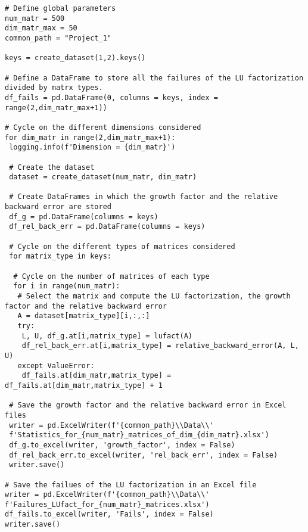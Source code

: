\documentclass[a4paper,11pt]{article}
\begin{document}
\begin{verbatim}
# Define global parameters
num_matr = 500
dim_matr_max = 50
common_path = "Project_1"

keys = create_dataset(1,2).keys()

# Define a DataFrame to store all the failures of the LU factorization divided by matrx types.
df_fails = pd.DataFrame(0, columns = keys, index = range(2,dim_matr_max+1))

# Cycle on the different dimensions considered
for dim_matr in range(2,dim_matr_max+1):
 logging.info(f'Dimension = {dim_matr}')

 # Create the dataset
 dataset = create_dataset(num_matr, dim_matr)

 # Create DataFrames in which the growth factor and the relative backward error are stored
 df_g = pd.DataFrame(columns = keys)
 df_rel_back_err = pd.DataFrame(columns = keys)

 # Cycle on the different types of matrices considered
 for matrix_type in keys:

  # Cycle on the number of matrices of each type 
  for i in range(num_matr):
   # Select the matrix and compute the LU factorization, the growth factor and the relative backward error
   A = dataset[matrix_type][i,:,:]
   try:
    L, U, df_g.at[i,matrix_type] = lufact(A)
    df_rel_back_err.at[i,matrix_type] = relative_backward_error(A, L, U)
   except ValueError:
    df_fails.at[dim_matr,matrix_type] = df_fails.at[dim_matr,matrix_type] + 1

 # Save the growth factor and the relative backward error in Excel files
 writer = pd.ExcelWriter(f'{common_path}\\Data\\'
 f'Statistics_for_{num_matr}_matrices_of_dim_{dim_matr}.xlsx')
 df_g.to_excel(writer, 'growth_factor', index = False)
 df_rel_back_err.to_excel(writer, 'rel_back_err', index = False)
 writer.save()

# Save the failues of the LU factorization in an Excel file
writer = pd.ExcelWriter(f'{common_path}\\Data\\'
f'Failures_LUfact_for_{num_matr}_matrices.xlsx')
df_fails.to_excel(writer, 'Fails', index = False)
writer.save()
\end{verbatim}
\end{document}
